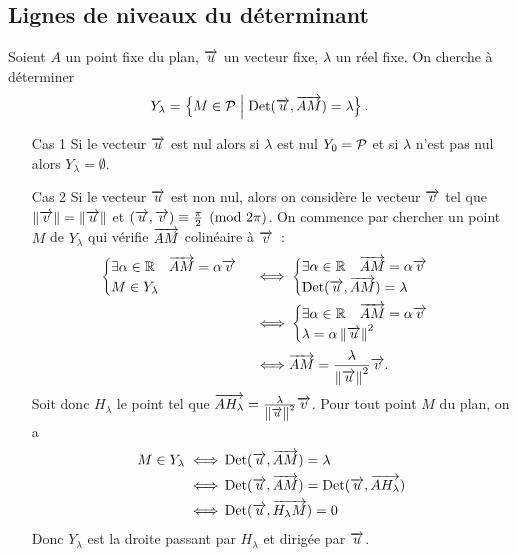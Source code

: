 \subsection{Lignes de niveaux du déterminant}
Soient \(A\) un point fixe du plan, \(\vu\) un vecteur fixe, \(\lambda\) un réel fixe. On cherche à déterminer
\begin{equation} 
  Y_\lambda = \enstq{M \in \P}{\Det(\vu, \vect{AM})=\lambda}.
\end{equation}
\begin{enumerate}
\item[Cas 1] Si le vecteur \(\vu\) est nul alors si \(\lambda\) est nul \(Y_0=\P\) et si \(\lambda\) n'est pas nul alors \(Y_\lambda=\emptyset\).
\item[Cas 2] Si le vecteur \(\vu\) est non nul, alors on considère le vecteur \(\vv\) tel que \(\norme{\vv}=\norme{\vu}\) et \(\congru{(\vu,\vv)}{\frac{\pi}{2}}{2\pi}\). On commence par chercher un point \(M\) de \(Y_\lambda\) qui vérifie \(\vect{AM}\) colinéaire à \(\vv\)~:
  \begin{align}
    \begin{cases} \exists \alpha \in \R \quad \vect{AM}=\alpha \vv \\  M \in Y_\lambda\end{cases}  \iff & \begin{cases}\exists \alpha \in \R \quad \vect{AM}=\alpha \vv \\ \Det(\vu,\vect{AM})=\lambda\end{cases} \\
    \iff & \begin{cases} \exists \alpha \in \R \quad \vect{AM}=\alpha \vv \\ \lambda=\alpha \norme{\vu}^2\end{cases} \\
    \iff & \vect{AM}=\frac{\lambda}{\norme{\vu}^2} \vv.
  \end{align}
  Soit donc \(H_\lambda\) le point tel que \(\vect{AH_\lambda}=\frac{\lambda}{\norme{\vu}^2} \vv\). Pour tout point \(M\) du plan, on a
  \begin{align}
    M \in Y_\lambda \iff & \Det(\vu,\vect{AM})=\lambda \\ 
    \iff & \Det(\vu,\vect{AM})=\Det(\vu,\vect{AH_\lambda}) \\ 
    \iff & \Det(\vu,\vect{H_\lambda M})=0
  \end{align}
  Donc \(Y_\lambda\) est la droite passant par \(H_\lambda\) et dirigée par \(\vu\).
\end{enumerate}

